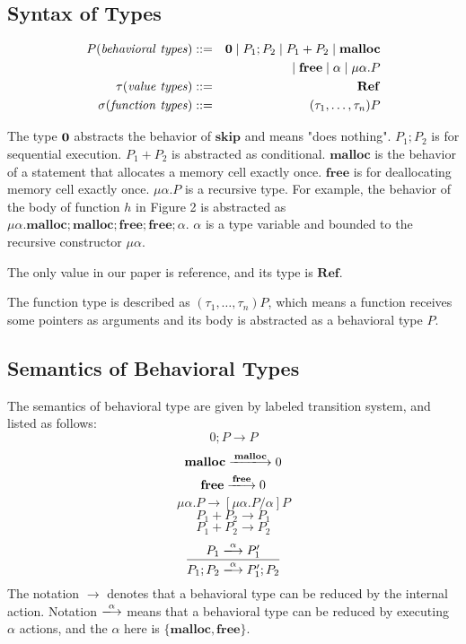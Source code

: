 \documentclass[english]{jssst_ppl} %
\newcommand\tB{\;|\;}
\newcommand\SKIP{\mathbf{skip}}
\newcommand\Malloc{\mathbf{malloc}}
\newcommand\Free{\mathbf{free}}
\theoremstyle{definition}
\begin{document}
\subsection{Syntax of Types}
     \begin{eqnarray*}
       P (\mathit{behavioral\ types})::=&& {\bf 0} \tB P_{1};P_{2} \tB P_{1}+P_{2} \tB \Malloc\\
       &&\tB \Free \tB \alpha \tB \mu\alpha.P \\
       \tau (\mathit{value\ types})::=&&    \mathbf{Ref}  \\ %
       \sigma (\mathit{function\ types})::=&& (\tau_{1},\dots, \tau_{n}) P
     \end{eqnarray*}

The type $\bf 0$ abstracts the behavior of $\SKIP$ and means "does nothing". $P_{1};P_{2}$ is for sequential execution. $P_{1} + P_{2}$ is abstracted as conditional. $\Malloc$ is the behavior of a statement that allocates a memory cell exactly once. $\Free$ is for deallocating memory cell exactly once. $\mu \alpha. P$ is a recursive type. For example, the behavior of  the body of function $h$ in Figure 2 is abstracted as $\mu \alpha. \Malloc;\Malloc;\Free;\Free;\alpha$. $\alpha$ is a type variable and bounded to the recursive constructor $\mu \alpha$.

The only value in our paper is reference, and its type is $\mathbf{Ref}$.

The function type is described as $(\tau_{1}, \dots, \tau_{n})P$, which means a function receives some pointers as arguments and its body is abstracted as a behavioral type $P$.

\subsection{Semantics of Behavioral Types}
The semantics of behavioral type are given by labeled transition system, and listed as follows:
    $$
         0;P \rightarrow P
    $$
    $$
          \Malloc \xlongrightarrow{\Malloc} 0
    $$
    $$
           \Free \xlongrightarrow{\Free} 0
    $$
    $$
          \mu \alpha.P \rightarrow  [\mu \alpha . P/\alpha]  P
    $$
   $$
          P_{1} + P_{2} \longrightarrow P_{1}
   $$
   $$
          P_{1} + P_{2} \longrightarrow P_{2}
   $$
   $$
           \frac{P_{1} \xlongrightarrow{\alpha} P_{1}' }
                 {P_{1};P_{2} \xlongrightarrow{\alpha} P_{1}';P_{2}}
   $$
The notation $\rightarrow$ denotes that a behavioral type can be reduced by the internal action. Notation $\xlongrightarrow{\alpha}$ means that a behavioral type can be reduced by executing $\alpha$ actions, and the $\alpha$ here is $\{\Malloc, \Free\}$.
\end{document}
